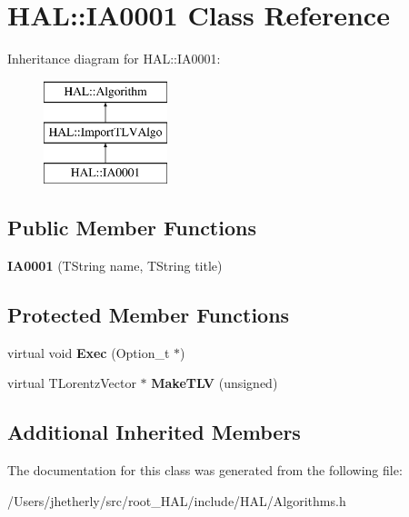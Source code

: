 \hypertarget{class_h_a_l_1_1_i_a0001}{\section{H\-A\-L\-:\-:I\-A0001 Class Reference}
\label{class_h_a_l_1_1_i_a0001}
}
Inheritance diagram for H\-A\-L\-:\-:I\-A0001\-:\begin{figure}[H]
\begin{center}
\leavevmode
\includegraphics[height=3.000000cm]{class_h_a_l_1_1_i_a0001}
\end{center}
\end{figure}
\subsection*{Public Member Functions}
\begin{DoxyCompactItemize}
\item 
\hypertarget{class_h_a_l_1_1_i_a0001_a297e0a7b26f6b0cf7669d15c4492cde9}{{\bfseries I\-A0001} (T\-String name, T\-String title)}\label{class_h_a_l_1_1_i_a0001_a297e0a7b26f6b0cf7669d15c4492cde9}

\end{DoxyCompactItemize}
\subsection*{Protected Member Functions}
\begin{DoxyCompactItemize}
\item 
\hypertarget{class_h_a_l_1_1_i_a0001_a5e66185dd1be784cc1e619fcb3350f6b}{virtual void {\bfseries Exec} (Option\-\_\-t $\ast$)}\label{class_h_a_l_1_1_i_a0001_a5e66185dd1be784cc1e619fcb3350f6b}

\item 
\hypertarget{class_h_a_l_1_1_i_a0001_a4e97323778e70612eae8978afdb6243f}{virtual T\-Lorentz\-Vector $\ast$ {\bfseries Make\-T\-L\-V} (unsigned)}\label{class_h_a_l_1_1_i_a0001_a4e97323778e70612eae8978afdb6243f}

\end{DoxyCompactItemize}
\subsection*{Additional Inherited Members}


The documentation for this class was generated from the following file\-:\begin{DoxyCompactItemize}
\item 
/\-Users/jhetherly/src/root\-\_\-\-H\-A\-L/include/\-H\-A\-L/Algorithms.\-h\end{DoxyCompactItemize}

